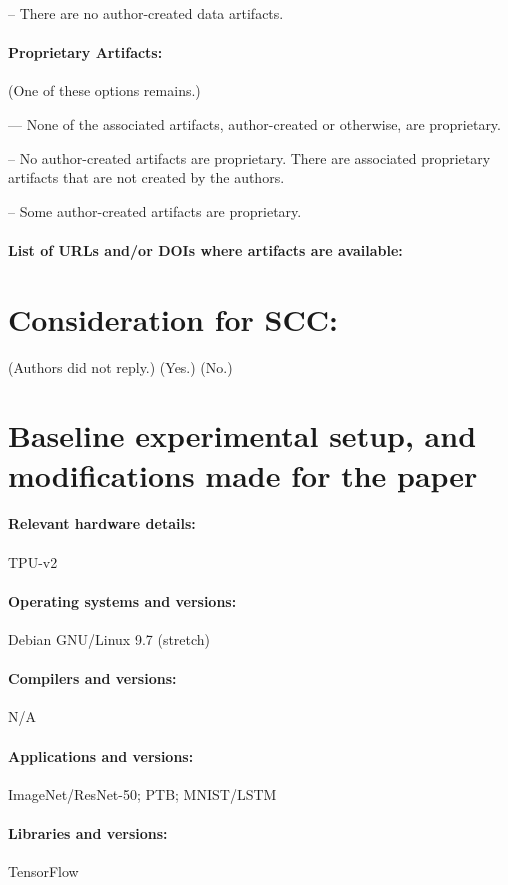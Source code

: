\documentclass[sigconf,nonacm=true]{acmart}
\begin{document}
-- There are no author-created data artifacts.



\paragraph{Proprietary Artifacts:}  (One of these options remains.)

--- None of the associated artifacts, author-created or otherwise, are proprietary.

-- No author-created artifacts are proprietary. There are associated proprietary artifacts that are not created by the authors.

-- Some author-created artifacts are proprietary.

\paragraph{List of URLs and/or DOIs where artifacts are available:}

\section*{Consideration for SCC:} 
(Authors did not reply.) (Yes.) (No.)

\section*{Baseline experimental setup, and modifications made for the paper}

\paragraph{Relevant hardware details:} TPU-v2
\paragraph{Operating systems and versions:} Debian GNU/Linux 9.7 (stretch)
\paragraph{Compilers and versions:} N/A
\paragraph{Applications and versions:} ImageNet/ResNet-50; PTB; MNIST/LSTM
\paragraph{Libraries and versions:}  TensorFlow
\end{document}
